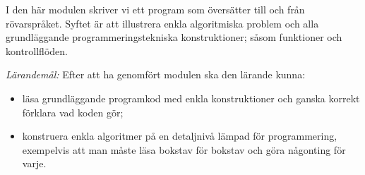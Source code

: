 
I den här modulen skriver vi ett program som översätter till och från 
rövarspråket.
Syftet är att illustrera enkla algoritmiska problem och alla grundläggande 
programmeringstekniska konstruktioner; såsom funktioner och kontrollflöden.

\emph{Lärandemål:}
Efter att ha genomfört modulen ska den lärande kunna:
\begin{itemize}
  \item läsa grundläggande programkod med enkla konstruktioner
    och ganska korrekt förklara vad koden gör;
  \item konstruera enkla algoritmer på en detaljnivå lämpad för programmering, 
    exempelvis att man måste läsa bokstav för bokstav och göra någonting för 
    varje.
\end{itemize}

